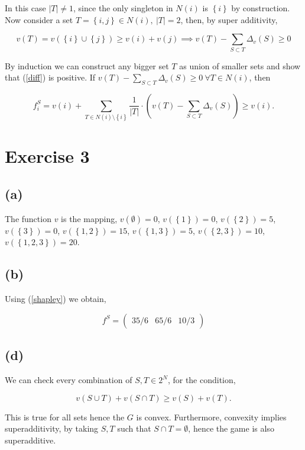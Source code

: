 \documentclass[american]{scrartcl}
\newcommand{\set}[1]{\left\{#1\right\}}
\newcommand{\abs}[1]{\left\lvert #1 \right\rvert}
\begin{document}
In this case $\abs{T} \neq 1$, since the only singleton in $N(i)$ is $\set{i}$ by construction. Now consider a set $T = \set{i, j} \in N(i), \ \abs{T} = 2$, then, by super additivity,

\begin{equation}
    v(T) = v\left( \set{i} \cup \set{j} \right) \geq v(i) + v(j) \implies v(T) - \sum_{S \subset T} \Delta_v(S) \geq 0
\end{equation}

By induction we can construct any bigger set $T$ as union of smaller sets and show that (\ref{diff}) is positive. If $v(T) -\sum_{S \subset T} \Delta_v(S) \geq 0 \ \forall T \in N(i)$, then

\begin{equation}
    f^S_i = v(i) + \sum_{T \in N(i) \setminus \set{i} } \frac{1}{\abs{T}} \cdot \left( v(T) - \sum_{S \subset T} \Delta_v(S) \right) \geq v(i).
\end{equation}

\section*{Exercise 3}

\subsection*{(a)}

The function $v$ is the mapping, $v(\emptyset) = 0$,
$v(\set{1}) = 0$,
$v(\set{2}) = 5$,
$v(\set{3}) = 0$,
$v(\set{1, 2}) = 15$,
$v(\set{1, 3}) = 5$,
$v(\set{2, 3}) = 10$,
$v(\set{1, 2, 3}) = 20$.

\subsection*{(b)}

Using (\ref{shapley}) we obtain,

\begin{equation}
    f^S = \begin{pmatrix}
        35/6 & 65/6 & 10/3
    \end{pmatrix}
\end{equation}

\subsection*{(d)}
We can check every combination of $S, T \in 2^N$, for the condition,

\begin{equation}
    v\left(S \cup T\right) + v\left(S \cap T\right) \geq v(S) + v(T).
\end{equation}

This is true for all sets hence the $G$ is convex. Furthermore, convexity implies superadditivity, by taking $S, T$ such that $S \cap T = \emptyset$, hence the game is also superadditive.
\end{document}
